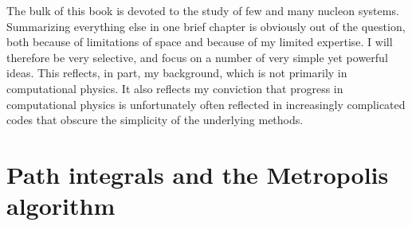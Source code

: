  The bulk of this book is devoted to the study of few and many nucleon
systems. Summarizing everything else in one brief chapter is obviously
out of the question, both because of limitations of space and because
of my limited expertise. I will therefore be very selective, and focus 
on a number of very simple yet powerful ideas. This reflects, in part, 
my background, which is not primarily in computational physics. It 
also reflects my conviction that progress in computational physics is 
unfortunately often reflected in increasingly complicated codes that 
obscure the simplicity of the underlying methods. 

\section{Path integrals and the Metropolis algorithm}
\label{sec_qm}

